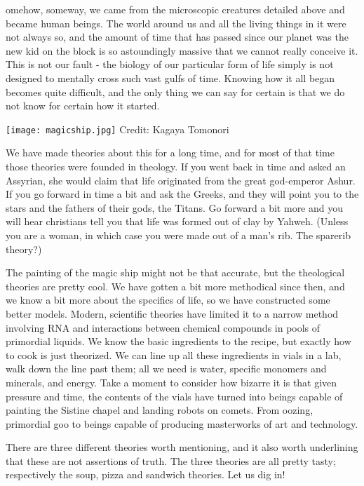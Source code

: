 omehow, someway, we came from the microscopic creatures detailed above and became human beings.
The world around us and all the living things in it were not always so, and the amount of time that has passed since our planet was the new kid on the block is so astoundingly massive that we cannot really conceive it.
This is not our fault - the biology of our particular form of life simply is not designed to mentally cross such vast gulfs of time.
Knowing how it all began becomes quite difficult, and the only thing we can say for certain is that we do not know for certain how it started.

\vspace{5mm}

\begin{center}
	\texttt{[image: magicship.jpg]}
	\tiny{Credit: Kagaya Tomonori}
\end{center}

We have made theories about this for a long time, and for most of that time those theories were founded in theology.
If you went back in time and asked an Assyrian, she would claim that life originated from the great god-emperor Ashur.
If you go forward in time a bit and ask the Greeks, and they will point you to the stars and the fathers of their gods, the Titans.
Go forward a bit more and you will hear christians tell you that life was formed out of clay by Yahweh.
(Unless you are a woman, in which case you were made out of a man’s rib.
The sparerib theory?)

The painting of the magic ship might not be that accurate, but the theological theories are pretty cool.
We have gotten a bit more methodical since then, and we know a bit more about the specifics of life, so we have constructed some better models.
Modern, scientific theories have limited it to a narrow method involving RNA and interactions between chemical compounds in pools of primordial liquids.
We know the basic ingredients to the recipe, but exactly how to cook is just theorized.
We can line up all these ingredients in vials in a lab, walk down the line past them; all we need is water, specific monomers and minerals, and energy.
Take a moment to consider how bizarre it is that given pressure and time, the contents of the vials have turned into beings capable of painting the Sistine chapel and landing robots on comets.
From oozing, primordial goo to beings capable of producing masterworks of art and technology.

There are three different theories worth mentioning, and it also worth underlining that these are not assertions of truth.
The three theories are all pretty tasty; respectively the soup, pizza and sandwich theories.
Let us dig in!

